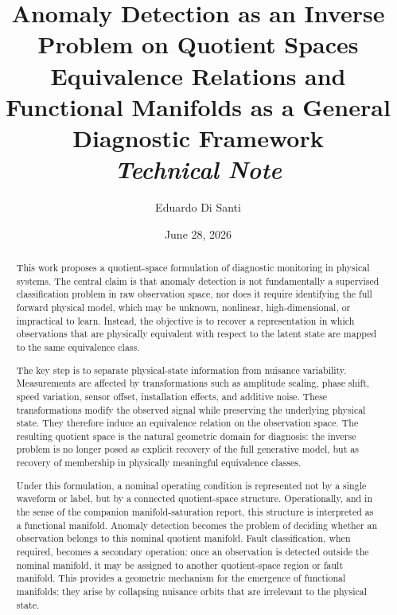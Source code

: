 \documentclass[11pt,letterpaper]{article}
\title{
\textbf{Anomaly Detection as an Inverse Problem on Quotient Spaces}\\[0.4em]
\large Equivalence Relations and Functional Manifolds as a General Diagnostic Framework\\[0.6em]
\normalsize\itshape Technical Note
}
\author[1]{Eduardo Di Santi}
\affil[1]{Department of Applied Mathematics, University of Colorado Boulder}
\date{June 28, 2026}
\begin{document}
\maketitle

\begin{abstract}
This work proposes a quotient-space formulation of diagnostic monitoring in physical systems. The central claim is that anomaly detection is not fundamentally a supervised classification problem in raw observation space, nor does it require identifying the full forward physical model, which may be unknown, nonlinear, high-dimensional, or impractical to learn. Instead, the objective is to recover a representation in which observations that are physically equivalent with respect to the latent state are mapped to the same equivalence class.

The key step is to separate physical-state information from nuisance variability. Measurements are affected by transformations such as amplitude scaling, phase shift, speed variation, sensor offset, installation effects, and additive noise. These transformations modify the observed signal while preserving the underlying physical state. They therefore induce an equivalence relation on the observation space. The resulting quotient space is the natural geometric domain for diagnosis: the inverse problem is no longer posed as explicit recovery of the full generative model, but as recovery of membership in physically meaningful equivalence classes.

Under this formulation, a nominal operating condition is represented not by a single waveform or label, but by a connected quotient-space structure. Operationally, and in the sense of the companion manifold-saturation report, this structure is interpreted as a functional manifold. Anomaly detection becomes the problem of deciding whether an observation belongs to this nominal quotient manifold. Fault classification, when required, becomes a secondary operation: once an observation is detected outside the nominal manifold, it may be assigned to another quotient-space region or fault manifold. This provides a geometric mechanism for the emergence of functional manifolds: they arise by collapsing nuisance orbits that are irrelevant to the physical state.


\end{abstract}
\end{document}
